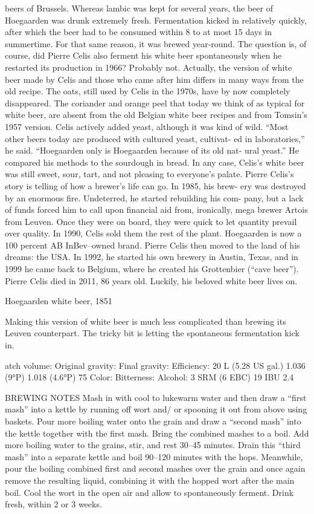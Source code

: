 \documentclass[a4paper,parskip=half]{scrartcl}
\begin{document}
beers of Brussels. Whereas lambic was kept
for several years, the beer of Hoegaarden
was drunk extremely fresh. Fermentation
kicked in relatively quickly, after which
the beer had to be consumed within 8 to
at most 15 days in summertime. For that
same reason, it was brewed year-round.
The question is, of course, did Pierre Celis
also ferment his white beer spontaneously
when he restarted its production in 1966?
Probably not. Actually, the version of white
beer made by Celis and those who came
after him differs in many ways from the old
recipe. The oats, still used by Celis in the
1970s, have by now completely disappeared.
The coriander and orange peel that today we
think of as typical for white beer, are absent
from the old Belgian white beer recipes and
from Tomsin’s 1957 version.
Celis actively added yeast, although it
was kind of wild. “Most other beers today
are produced with cultured yeast, cultivat-
ed in laboratories,” he said. “Hoegaarden
only is Hoegaarden because of its old nat-
ural yeast.” He compared his methods to
the sourdough in bread. In any case, Celis’s
white beer was still sweet, sour, tart, and
not pleasing to everyone’s palate.
Pierre Celis’s story is telling of how a
brewer’s life can go. In 1985, his brew-
ery was destroyed by an enormous fire.
Undeterred, he started rebuilding his com-
pany, but a lack of funds forced him to call
upon financial aid from, ironically, mega
brewer Artois from Leuven. Once they were
on board, they were quick to let quantity
prevail over quality. In 1990, Celis sold
them the rest of the plant. Hoegaarden is
now a 100 percent AB InBev–owned brand.
Pierre Celis then moved to the land of his
dreams: the USA. In 1992, he started his
own brewery in Austin, Texas, and in 1999
he came back to Belgium, where he created
his Grottenbier (“cave beer”).
Pierre Celis died in 2011, 86 years old.
Luckily, his beloved white beer lives on.

Hoegaarden
white beer, 1851

Making this version of white beer is much less complicated than brewing its Leuven counterpart. The tricky
bit is letting the spontaneous fermentation kick in.

atch volume:
Original gravity:
Final gravity:
Efficiency:
20 L (5.28 US gal.)
1.036 (9°P)
1.018 (4.6°P)
75%
Color:
Bitterness:
Alcohol:
3 SRM (6 EBC)
19 IBU
2.4%

BREWING NOTES
Mash in with cool to lukewarm water and then draw a “first mash” into a kettle by running off wort and/
or spooning it out from above using baskets. Pour more boiling water onto the grain and draw a “second
mash” into the kettle together with the first mash. Bring the combined mashes to a boil. Add more boiling
water to the grains, stir, and rest 30–45 minutes. Drain this “third mash” into a separate kettle and boil
90–120 minutes with the hops. Meanwhile, pour the boiling combined first and second mashes over the
grain and once again remove the resulting liquid, combining it with the hopped wort after the main boil.
Cool the wort in the open air and allow to spontaneously ferment. Drink fresh, within 2 or 3 weeks.
\end{document}
